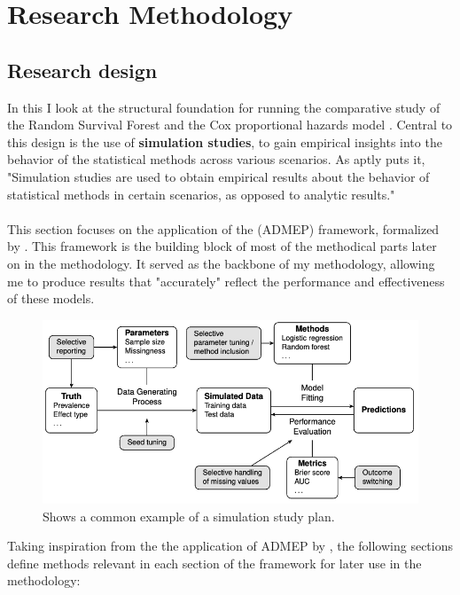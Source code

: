 \chapter{Research Methodology}
\label{Chapter3} %

\section{Research design} \label{design}

\noindent In this I look at the structural foundation for running the comparative study of the Random Survival Forest \parencite{ishwaran_random_2008} and the Cox proportional hazards model \parencite{cox_regression_1972}. Central to this design is the use of \textbf{simulation studies}, to gain empirical insights into the behavior of the statistical methods across various scenarios. As \parencite{morris_using_2019} aptly puts it, "Simulation studies are used to obtain empirical results about the behavior of statistical methods in certain scenarios, as opposed to analytic results."
\\\\
\noindent This section focuses on the application of the (ADMEP) framework, formalized by \parencite{morris_using_2019}. This framework is the building block of most of the methodical parts later on in the methodology. It served as the backbone of my methodology, allowing me to produce results that "accurately" reflect the performance and effectiveness of these models.

\begin{figure}[h]
 \centering
 \includegraphics[scale=0.25]{Figures/METHOD_GRAPH.png}
 \caption{\parencite{pawel_pitfalls_2024} Shows a common example of a simulation study plan.}
\end{figure}

\noindent Taking inspiration from the the application of ADMEP by \parencite{pawel_pitfalls_2024}, the following sections define methods relevant in each section of the framework for later use in the methodology:

